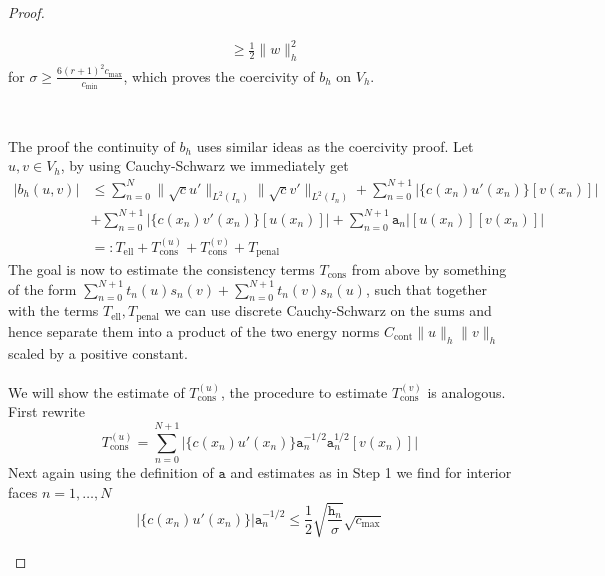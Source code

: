 \begin{proof}
\begin{proofstep}[Coercivity]
\begin{align*}
            &\geq \frac{1}{2} \|w\|_h^2
        \end{align*}
        for $\sigma \geq \frac{6 (r+1)^2 c_{\max} }{c_{\min}}$, which proves the coercivity
        of $b_h$ on $V_h$. 
    \end{proofstep}
    \\
    \begin{proofstep}[Continuity]
        The proof the continuity of $b_h$ uses similar ideas as the coercivity proof. Let 
        $u,v \in V_h$, by using Cauchy-Schwarz we 
        immediately get
        \begin{align}
            |b_h(u,v)| &\leq \sum_{n=0}^{N} \|\sqrt{c}u'\|_{L^2(I_n)} \|\sqrt{c}v'\|_{L^2(I_n)} 
            +  \sum_{n=0}^{N+1} \big| \{c(x_n)u'(x_n)\}[v(x_n)] \big| \nonumber \\ 
            &+\sum_{n=0}^{N+1} \big|\{c(x_n)v'(x_n)\}[u(x_n)]\big|
            +\sum_{n=0}^{N+1} \texttt{a}_n \big|[u(x_n)][v(x_n)]\big| \nonumber \\
            &=: T_{\text{ell}} + T_{\text{cons}}^{(u)} + T_{\text{cons}}^{(v)} + T_{\text{penal}}
            \label{eq:cont_thr_estimate_elliptic_part}            
        \end{align}
        The goal is now to estimate the consistency terms $T_{\text{cons}}$ from above by something of the form
        $ \sum_{n=0}^{N+1} t_n(u) s_n(v) + \sum_{n=0}^{N+1} t_n(v) s_n(u)$, such that together with the terms
        $T_{\text{ell}}, T_{\text{penal}}$ we can use discrete Cauchy-Schwarz on the sums and hence separate them into
        a product of the two energy norms $C_{\text{cont}} \|u\|_{h}\|v\|_{h} $ scaled by a positive constant. \\ \\
        We will show the estimate of $T_{\text{cons}}^{(u)}$, the procedure to estimate $T_{\text{cons}}^{(v)}$ is analogous. \\ 
        First rewrite
        \begin{equation}
            \label{eq:continuity_thr_consistency_term}
            T_{\text{cons}}^{(u)} = \sum_{n=0}^{N+1} \big| \{c(x_n)u'(x_n)\} \texttt{a}_n^{-1/2}\texttt{a}_n^{1/2} [v(x_n)] \big|
        \end{equation} 
        Next again using the definition of $\texttt{a}$ and estimates as in Step 1 we find for interior faces $n = 1,\ldots,N$
        \begin{equation}
            \big|\{c(x_n)u'(x_n)\}\big|\texttt{a}_n^{-1/2} 
            \leq \frac{1}{2} \sqrt{\frac{\texttt{h}_n}{\sigma}} \sqrt{c_{\max}}

\end{equation}
\end{proofstep}
\end{proof}
